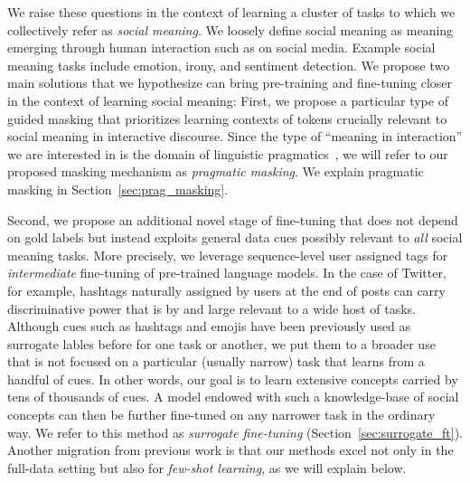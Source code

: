 % 
We raise these questions in the context of learning a cluster of tasks to which we collectively refer as \textit{social meaning}. We loosely define social meaning as meaning emerging through human interaction such as on social media. Example social meaning tasks include emotion, irony, and sentiment detection. We propose two main solutions that we hypothesize can bring pre-training and fine-tuning closer in the context of learning social meaning: First, we propose a particular type of guided masking that prioritizes learning contexts of tokens %
crucially relevant to social meaning in interactive discourse. Since the type of ``meaning in interaction'' we are interested in is the domain of linguistic pragmatics~\cite{thomas2014meaning}, we will refer to our proposed masking mechanism as \textit{pragmatic masking}. We explain pragmatic masking in Section~\ref{sec:prag_masking}. 

Second, we propose an additional novel stage of fine-tuning that does not depend on gold labels but instead exploits general data cues possibly relevant to \textit{all} social meaning tasks. More precisely, we leverage sequence-level user assigned tags for \textit{intermediate} fine-tuning of pre-trained language models. In the case of Twitter, for example, hashtags naturally assigned by users at the end of posts can carry discriminative power that is by and large relevant to a wide host of tasks. Although cues such as hashtags and emojis have been previously used as surrogate lables before for one task or another, we put them to a broader use that is not focused on a particular (usually narrow) task that learns from a handful of cues. In other words, our goal is to learn extensive concepts carried by tens of thousands of cues. A model endowed with such a knowledge-base of social concepts can then be further fine-tuned on any narrower task in the ordinary way. We refer to this method as \textit{surrogate fine-tuning} (Section~\ref{sec:surrogate_ft}). Another migration from previous work is that our methods excel not only in the full-data setting but also for \textit{few-shot learning}, as we will explain below.

